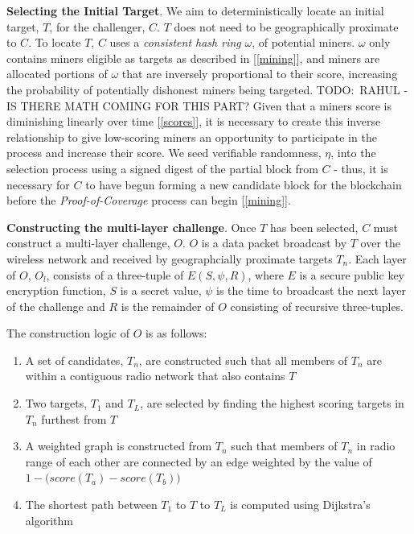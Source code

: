 \documentclass[letterpaper,11pt]{article}
\newcommand{\todo}[1]{}
\renewcommand{\todo}[1]{{\color{red} TODO:\ {#1}}}
\begin{document}
\textbf{Selecting the Initial Target}. We aim to deterministically locate an initial target, $T$, for the challenger, $C$. $T$ does not need to be geographically proximate to $C$. To locate $T$, $C$ uses a \emph{consistent hash ring} $\omega$, of potential miners. $\omega$ only contains miners eligible as targets as described in [\ref{mining}], and miners are allocated portions of $\omega$ that are inversely proportional to their score, increasing the probability of potentially dishonest miners being targeted. \todo{RAHUL - IS THERE MATH COMING FOR THIS PART?} Given that a miners score is diminishing linearly over time [\ref{scores}], it is necessary to create this inverse relationship to give low-scoring miners an opportunity to participate in the process and increase their score. We seed verifiable randomness, $\eta$, into the selection process using a signed digest of the partial block from $C$ - thus, it is necessary for $C$ to have begun forming a new candidate block for the blockchain before the \emph{Proof-of-Coverage} process can begin [\ref{mining}].

\textbf{Constructing the multi-layer challenge}. Once $T$ has been selected, $C$ must construct a multi-layer challenge, $O$. $O$ is a data packet broadcast by $T$ over the wireless network and received by geographcially proximate targets $T_n$. Each layer of $O$, $O_l$, consists of a three-tuple of $E\left(S, \psi, R\right)$, where $E$ is a secure public key encryption function, $S$ is a secret value, $\psi$ is the time to broadcast the next layer of the challenge and $R$ is the remainder of $O$ consisting of recursive three-tuples.

The construction logic of $O$ is as follows:

\begin{enumerate}
  \item A set of candidates, $T_n$, are constructed such that all members of $T_n$ are within a contiguous radio network that also contains $T$
  \item Two targets, $T_1$ and $T_L$, are selected by finding the highest scoring targets in $T_n$ furthest from $T$
  \item A weighted graph is constructed from $T_n$ such that members of $T_n$ in radio range of each other are connected by an edge weighted by the value of \(1 - \Big({score(T_a) - score(T_b)}\Big)\)
  \item The shortest path between $T_1$ to $T$ to $T_L$ is computed using Dijkstra's algorithm\cite{dijkstra}
\end{enumerate}
\end{document}
